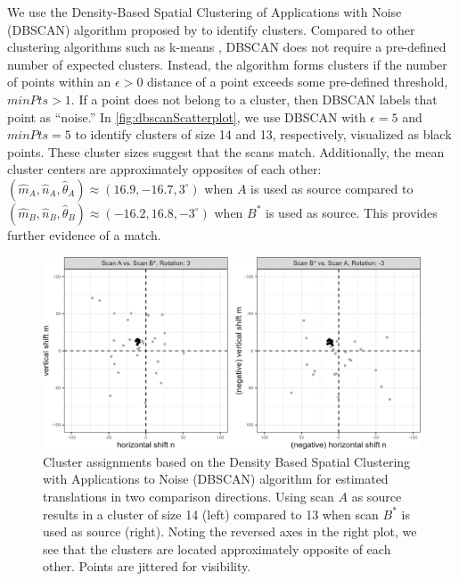 \documentclass[preprint]{JASA}
\begin{document}
We use the Density-Based Spatial Clustering of Applications with Noise
(DBSCAN) algorithm proposed by \citet{Ester1996} to identify clusters.
Compared to other clustering algorithms such as k-means
\citep{MacQueen1967}, DBSCAN does not require a pre-defined number of
expected clusters. Instead, the algorithm forms clusters if the number
of points within an \(\epsilon > 0\) distance of a point exceeds some
pre-defined threshold, \(minPts > 1\). If a point does not belong to a
cluster, then DBSCAN labels that point as ``noise.'' In
\autoref{fig:dbscanScatterplot}, we use DBSCAN with \(\epsilon = 5\) and
\(minPts = 5\) to identify clusters of size 14 and 13, respectively,
visualized as black points. These cluster sizes suggest that the scans
match. Additionally, the mean cluster centers are approximately
opposites of each other:
\((\hat{m}_A,\hat{n}_A,\hat{\theta}_A) \approx (16.9, -16.7, 3^\circ)\)
when \(A\) is used as source compared to
\((\hat{m}_B,\hat{n}_B,\hat{\theta}_B) \approx (-16.2, 16.8, -3^\circ)\)
when \(B^*\) is used as source. This provides further evidence of a
match.

\begin{figure}[htbp]
\includegraphics[width=.8\textwidth]{figures/dbscanScatterplot} \caption{\label{fig:dbscanScatterplot} Cluster assignments based on the Density Based Spatial Clustering with Applications to Noise (DBSCAN) algorithm for estimated translations in two comparison directions. Using scan $A$ as source results in a cluster of size 14 (left) compared to 13 when scan $B^*$ is used as source (right). Noting the reversed axes in the right plot, we see that the clusters are located approximately opposite of each other. Points are jittered for visibility.}\label{fig:unnamed-chunk-9}
\end{figure}
\end{document}
